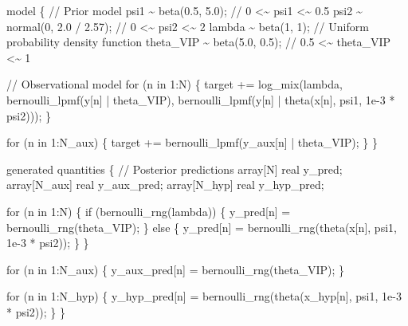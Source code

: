 \documentclass[
  letterpaper,
  DIV=11,
  numbers=noendperiod]{scrartcl}
\newenvironment{Shaded}{\begin{snugshade}}{\end{snugshade}}
\newcommand{\CommentTok}[1]{\textcolor[rgb]{0.37,0.37,0.37}{#1}}
\newcommand{\ControlFlowTok}[1]{\textcolor[rgb]{0.00,0.23,0.31}{#1}}
\newcommand{\DataTypeTok}[1]{\textcolor[rgb]{0.68,0.00,0.00}{#1}}
\newcommand{\DecValTok}[1]{\textcolor[rgb]{0.68,0.00,0.00}{#1}}
\newcommand{\FloatTok}[1]{\textcolor[rgb]{0.68,0.00,0.00}{#1}}
\newcommand{\KeywordTok}[1]{\textcolor[rgb]{0.00,0.23,0.31}{#1}}
\newcommand{\NormalTok}[1]{\textcolor[rgb]{0.00,0.23,0.31}{#1}}
\begin{document}
\begin{codelisting}
\begin{Shaded}
\begin{Highlighting}[]
\KeywordTok{model}\NormalTok{ \{}
  \CommentTok{// Prior model}
\NormalTok{  psi1 \textasciitilde{} beta(}\FloatTok{0.5}\NormalTok{, }\FloatTok{5.0}\NormalTok{);        }\CommentTok{// 0   \textless{}\textasciitilde{}    psi1   \textless{}\textasciitilde{} 0.5}
\NormalTok{  psi2 \textasciitilde{} normal(}\DecValTok{0}\NormalTok{, }\FloatTok{2.0}\NormalTok{ / }\FloatTok{2.57}\NormalTok{); }\CommentTok{// 0   \textless{}\textasciitilde{}    psi2   \textless{}\textasciitilde{} 2}
\NormalTok{  lambda \textasciitilde{} beta(}\DecValTok{1}\NormalTok{, }\DecValTok{1}\NormalTok{);          }\CommentTok{// Uniform probability density function}
\NormalTok{  theta\_VIP \textasciitilde{} beta(}\FloatTok{5.0}\NormalTok{, }\FloatTok{0.5}\NormalTok{);   }\CommentTok{// 0.5 \textless{}\textasciitilde{} theta\_VIP \textless{}\textasciitilde{} 1}

  \CommentTok{// Observational model}
  \ControlFlowTok{for}\NormalTok{ (n }\ControlFlowTok{in} \DecValTok{1}\NormalTok{:N) \{}
    \KeywordTok{target +=}\NormalTok{ log\_mix(lambda,}
\NormalTok{                      bernoulli\_lpmf(y[n] | theta\_VIP),}
\NormalTok{                      bernoulli\_lpmf(y[n] | theta(x[n], psi1, }\FloatTok{1e{-}3}\NormalTok{ * psi2)));}
\NormalTok{  \}}

  \ControlFlowTok{for}\NormalTok{ (n }\ControlFlowTok{in} \DecValTok{1}\NormalTok{:N\_aux) \{}
    \KeywordTok{target +=}\NormalTok{ bernoulli\_lpmf(y\_aux[n] | theta\_VIP);}
\NormalTok{  \}}
\NormalTok{\}}

\KeywordTok{generated quantities}\NormalTok{ \{}
  \CommentTok{// Posterior predictions}
  \DataTypeTok{array}\NormalTok{[N] }\DataTypeTok{real}\NormalTok{ y\_pred;}
  \DataTypeTok{array}\NormalTok{[N\_aux] }\DataTypeTok{real}\NormalTok{ y\_aux\_pred;}
  \DataTypeTok{array}\NormalTok{[N\_hyp] }\DataTypeTok{real}\NormalTok{ y\_hyp\_pred;}

  \ControlFlowTok{for}\NormalTok{ (n }\ControlFlowTok{in} \DecValTok{1}\NormalTok{:N) \{}
    \ControlFlowTok{if}\NormalTok{ (bernoulli\_rng(lambda)) \{}
\NormalTok{      y\_pred[n] = bernoulli\_rng(theta\_VIP);}
\NormalTok{    \} }\ControlFlowTok{else}\NormalTok{ \{}
\NormalTok{      y\_pred[n] = bernoulli\_rng(theta(x[n], psi1, }\FloatTok{1e{-}3}\NormalTok{ * psi2));}
\NormalTok{    \}}
\NormalTok{  \}}

  \ControlFlowTok{for}\NormalTok{ (n }\ControlFlowTok{in} \DecValTok{1}\NormalTok{:N\_aux) \{}
\NormalTok{    y\_aux\_pred[n] = bernoulli\_rng(theta\_VIP);}
\NormalTok{  \}}

  \ControlFlowTok{for}\NormalTok{ (n }\ControlFlowTok{in} \DecValTok{1}\NormalTok{:N\_hyp) \{}
\NormalTok{    y\_hyp\_pred[n] = bernoulli\_rng(theta(x\_hyp[n], psi1, }\FloatTok{1e{-}3}\NormalTok{ * psi2));}
\NormalTok{  \}}
\NormalTok{\}}
\end{Highlighting}
\end{Shaded}

\end{codelisting}
\end{document}
